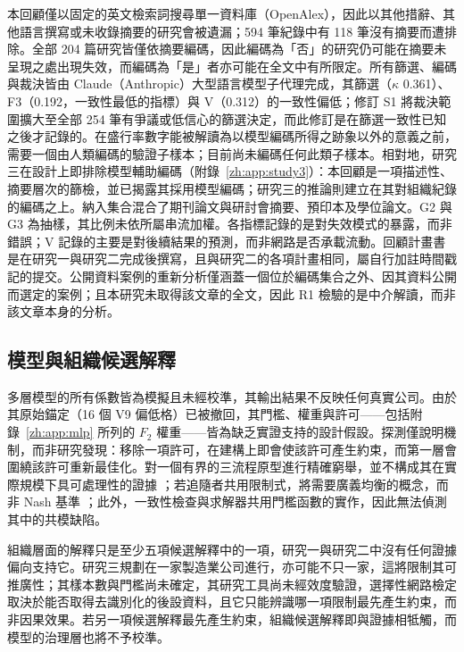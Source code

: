 本回顧僅以固定的英文檢索詞搜尋單一資料庫（OpenAlex），因此以其他措辭、其他語言撰寫或未收錄摘要的研究會被遺漏；594 筆紀錄中有 118 筆沒有摘要而遭排除。全部 204 篇研究皆僅依摘要編碼，因此編碼為「否」的研究仍可能在摘要未呈現之處出現失效，而編碼為「是」者亦可能在全文中有所限定。所有篩選、編碼與裁決皆由 Claude（Anthropic）大型語言模型子代理完成，其篩選（$\kappa$ 0.361）、F3（0.192，一致性最低的指標）與 V（0.312）的一致性偏低；修訂 S1 將裁決範圍擴大至全部 254 筆有爭議或低信心的篩選決定，而此修訂是在篩選一致性已知之後才記錄的。在盛行率數字能被解讀為以模型編碼所得之跡象以外的意義之前，需要一個由人類編碼的驗證子樣本；目前尚未編碼任何此類子樣本。相對地，研究三在設計上即排除模型輔助編碼（附錄~\ref{zh:app:study3}）：本回顧是一項描述性、摘要層次的篩檢，並已揭露其採用模型編碼；研究三的推論則建立在其對組織紀錄的編碼之上。納入集合混合了期刊論文與研討會摘要、預印本及學位論文。G2 與 G3 為抽樣，其比例未依所屬串流加權。各指標記錄的是對失效模式的暴露，而非錯誤；V 記錄的主要是對後續結果的預測，而非網路是否承載流動。回顧計畫書是在研究一與研究二完成後撰寫，且與研究二的各項計畫相同，屬自行加註時間戳記的提交。公開資料案例的重新分析僅涵蓋一個位於編碼集合之外、因其資料公開而選定的案例；且本研究未取得該文章的全文，因此 R1 檢驗的是中介解讀，而非該文章本身的分析。

\subsection{模型與組織候選解釋}
\label{zh:sec:lim_model}

多層模型的所有係數皆為模擬且未經校準，其輸出結果不反映任何真實公司。由於其原始錨定（16 個 V9 偏低格）已被撤回，其門檻、權重與許可——包括附錄~\ref{zh:app:mlp} 所列的 $F_2$ 權重——皆為缺乏實證支持的設計假設。探測僅說明機制，而非研究發現：移除一項許可，在建構上即會使該許可產生約束，而第一層會圍繞該許可重新最佳化。對一個有界的三流程原型進行精確窮舉，並不構成其在實際規模下具可處理性的證據 \citep{jeroslow1985polynomial}；若追隨者共用限制式，將需要廣義均衡的概念，而非 Nash 基準 \citep{nash1951noncooperative}；此外，一致性檢查與求解器共用門檻函數的實作，因此無法偵測其中的共模缺陷。

組織層面的解釋只是至少五項候選解釋中的一項，研究一與研究二中沒有任何證據偏向支持它。研究三規劃在一家製造業公司進行，亦可能不只一家，這將限制其可推廣性；其樣本數與門檻尚未確定，其研究工具尚未經效度驗證，選擇性網路檢定取決於能否取得去識別化的後設資料，且它只能辨識哪一項限制最先產生約束，而非因果效果。若另一項候選解釋最先產生約束，組織候選解釋即與證據相牴觸，而模型的治理層也將不予校準。

